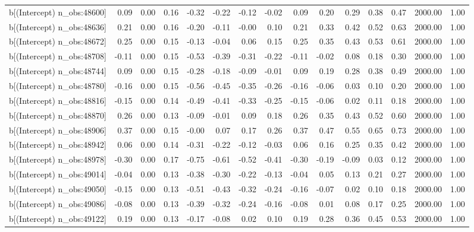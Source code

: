 \begin{table}[ht]
\begin{tabular}{rrrrrrrrrrrrrrr}
  b[(Intercept) n\_obs:48600] & 0.09 & 0.00 & 0.16 & -0.32 & -0.22 & -0.12 & -0.02 & 0.09 & 0.20 & 0.29 & 0.38 & 0.47 & 2000.00 & 1.00 \\ 
  b[(Intercept) n\_obs:48636] & 0.21 & 0.00 & 0.16 & -0.20 & -0.11 & -0.00 & 0.10 & 0.21 & 0.33 & 0.42 & 0.52 & 0.63 & 2000.00 & 1.00 \\ 
  b[(Intercept) n\_obs:48672] & 0.25 & 0.00 & 0.15 & -0.13 & -0.04 & 0.06 & 0.15 & 0.25 & 0.35 & 0.43 & 0.53 & 0.61 & 2000.00 & 1.00 \\ 
  b[(Intercept) n\_obs:48708] & -0.11 & 0.00 & 0.15 & -0.53 & -0.39 & -0.31 & -0.22 & -0.11 & -0.02 & 0.08 & 0.18 & 0.30 & 2000.00 & 1.00 \\ 
  b[(Intercept) n\_obs:48744] & 0.09 & 0.00 & 0.15 & -0.28 & -0.18 & -0.09 & -0.01 & 0.09 & 0.19 & 0.28 & 0.38 & 0.49 & 2000.00 & 1.00 \\ 
  b[(Intercept) n\_obs:48780] & -0.16 & 0.00 & 0.15 & -0.56 & -0.45 & -0.35 & -0.26 & -0.16 & -0.06 & 0.03 & 0.10 & 0.20 & 2000.00 & 1.00 \\ 
  b[(Intercept) n\_obs:48816] & -0.15 & 0.00 & 0.14 & -0.49 & -0.41 & -0.33 & -0.25 & -0.15 & -0.06 & 0.02 & 0.11 & 0.18 & 2000.00 & 1.00 \\ 
  b[(Intercept) n\_obs:48870] & 0.26 & 0.00 & 0.13 & -0.09 & -0.01 & 0.09 & 0.18 & 0.26 & 0.35 & 0.43 & 0.52 & 0.60 & 2000.00 & 1.00 \\ 
  b[(Intercept) n\_obs:48906] & 0.37 & 0.00 & 0.15 & -0.00 & 0.07 & 0.17 & 0.26 & 0.37 & 0.47 & 0.55 & 0.65 & 0.73 & 2000.00 & 1.00 \\ 
  b[(Intercept) n\_obs:48942] & 0.06 & 0.00 & 0.14 & -0.31 & -0.22 & -0.12 & -0.03 & 0.06 & 0.16 & 0.25 & 0.35 & 0.42 & 2000.00 & 1.00 \\ 
  b[(Intercept) n\_obs:48978] & -0.30 & 0.00 & 0.17 & -0.75 & -0.61 & -0.52 & -0.41 & -0.30 & -0.19 & -0.09 & 0.03 & 0.12 & 2000.00 & 1.00 \\ 
  b[(Intercept) n\_obs:49014] & -0.04 & 0.00 & 0.13 & -0.38 & -0.30 & -0.22 & -0.13 & -0.04 & 0.05 & 0.13 & 0.21 & 0.27 & 2000.00 & 1.00 \\ 
  b[(Intercept) n\_obs:49050] & -0.15 & 0.00 & 0.13 & -0.51 & -0.43 & -0.32 & -0.24 & -0.16 & -0.07 & 0.02 & 0.10 & 0.18 & 2000.00 & 1.00 \\ 
  b[(Intercept) n\_obs:49086] & -0.08 & 0.00 & 0.13 & -0.39 & -0.32 & -0.24 & -0.16 & -0.08 & 0.01 & 0.08 & 0.17 & 0.25 & 2000.00 & 1.00 \\ 
  b[(Intercept) n\_obs:49122] & 0.19 & 0.00 & 0.13 & -0.17 & -0.08 & 0.02 & 0.10 & 0.19 & 0.28 & 0.36 & 0.45 & 0.53 & 2000.00 & 1.00 \\ 

\end{tabular}
\end{table}
